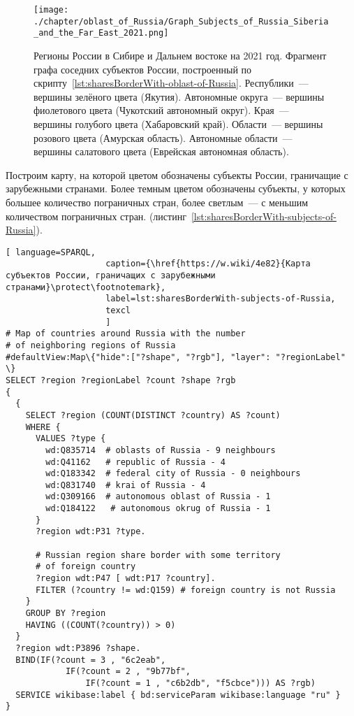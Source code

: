 \begin{fullwidth}
\begin{figure*}[h]
	\texttt{[image: ./chapter/oblast\_of\_Russia/Graph\_Subjects\_of\_Russia\_Siberia\_and\_the\_Far\_East\_2021.png]}
	\caption[Граф субъектов России. Калининград, 2021.]{Регионы России в Сибире и Дальнем востоке на 2021 год. Фрагмент графа соседних субъектов России, построенный по скрипту~\protect\ref{lst:sharesBorderWith-oblast-of-Russia}.
	Республики~--- вершины зелёного цвета (Якутия).
	Автономные округа~--- вершины фиолетового цвета (Чукотский автономный округ).
	Края~--- вершины голубого цвета (Хабаровский край).
	Области~--- вершины розового цвета (Амурская область).
	Автономные области~--- вершины салатового цвета (Еврейская автономная область).}%
      \label{fig:sharesBorderWith-oblast-of-Russia-Kaliningrad-fig}%
\end{figure*} 
\end{fullwidth}

\newpage
Построим карту, на которой цветом обозначены субъекты России, граничащие с зарубежными странами. Более темным цветом обозначены субъекты, у которых большее количество пограничных стран, более светлым~--- с меньшим количеством пограничных стран. (листинг~\protect\ref{lst:sharesBorderWith-subjects-of-Russia}).

\lstset{numbers=left, firstnumber=1, frame=single}
\begin{lstlisting}[ language=SPARQL, 
                    caption={\href{https://w.wiki/4e82}{Карта субъектов России, граничащих с зарубежными странами}\protect\footnotemark},
                    label=lst:sharesBorderWith-subjects-of-Russia,
                    texcl 
                    ]
# Map of countries around Russia with the number 
# of neighboring regions of Russia
#defaultView:Map\{"hide":["?shape", "?rgb"], "layer": "?regionLabel" \}
SELECT ?region ?regionLabel ?count ?shape ?rgb
{
  {
    SELECT ?region (COUNT(DISTINCT ?country) AS ?count)
    WHERE {
      VALUES ?type {
        wd:Q835714  # oblasts of Russia - 9 neighbours
        wd:Q41162   # republic of Russia - 4
        wd:Q183342  # federal city of Russia - 0 neighbours
        wd:Q831740  # krai of Russia - 4
        wd:Q309166  # autonomous oblast of Russia - 1
        wd:Q184122   # autonomous okrug of Russia - 1
      }
      ?region wdt:P31 ?type.
  
      # Russian region share border with some territory 
      # of foreign country
      ?region wdt:P47 [ wdt:P17 ?country].
      FILTER (?country != wd:Q159) # foreign country is not Russia
    }
    GROUP BY ?region
    HAVING ((COUNT(?country)) > 0)
  }
  ?region wdt:P3896 ?shape.
  BIND(IF(?count = 3 , "6c2eab", 
            IF(?count = 2 , "9b77bf", 
                IF(?count = 1 , "c6b2db", "f5cbce"))) AS ?rgb)
  SERVICE wikibase:label { bd:serviceParam wikibase:language "ru" }  
}
\end{lstlisting}%

